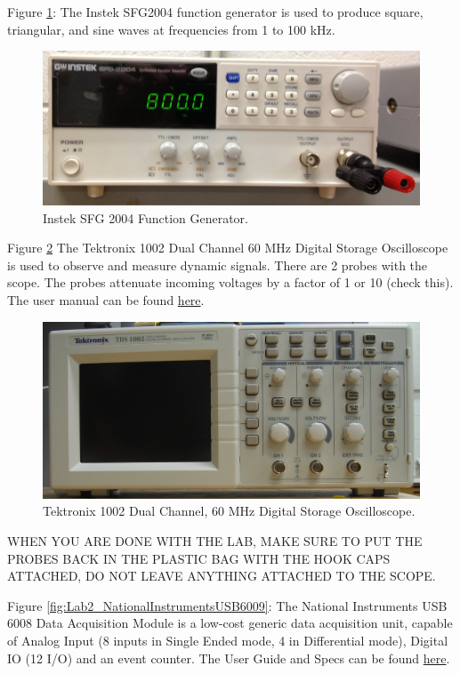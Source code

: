 \documentclass[11pt,letterpaper]{article}
\begin{document}
Figure \ref{fig:Lab2_Instek_SFG2004_FunctionGenerator}: The Instek SFG2004 function generator is used to produce square, triangular, and sine waves at frequencies from 1 to 100 kHz.\\

\begin{figure}
\centering
\includegraphics[width=0.7\linewidth]{Lab2_Instek_SFG2004_FunctionGenerator}
\caption{Instek SFG 2004 Function Generator.}
\label{fig:Lab2_Instek_SFG2004_FunctionGenerator}
\end{figure}


Figure \ref{fig:Lab2_Tektronix1002_Oscilloscope} The Tektronix 1002 Dual Channel 60 MHz Digital Storage Oscilloscope is used to observe and measure dynamic signals.  There are 2 probes with the scope.  The probes attenuate incoming voltages by a factor of 1 or 10 (check this). The user manual can be found \href{http://abe-research.illinois.edu/Faculty/grift/ABE425_2016/Specs/tds1002_user_manual.pdf}{here}.

\begin{figure}
\centering
\includegraphics[width=0.7\linewidth]{Lab2_Tektronix1002_Oscilloscope}
\caption{Tektronix 1002 Dual Channel, 60 MHz Digital Storage Oscilloscope.}
\label{fig:Lab2_Tektronix1002_Oscilloscope}
\end{figure}

\begin{center}
WHEN YOU ARE DONE WITH THE LAB, MAKE SURE TO PUT THE PROBES BACK IN THE PLASTIC BAG WITH THE HOOK CAPS ATTACHED, DO NOT LEAVE ANYTHING ATTACHED TO THE SCOPE.
\end{center}

Figure \ref{fig:Lab2_NationalInstrumentsUSB6009}: The National Instruments USB 6008 Data Acquisition Module is a low-cost generic data acquisition unit, capable of Analog Input (8 inputs in Single Ended mode, 4 in Differential mode), Digital IO (12 I/O) and an event counter. The User Guide and Specs can be found \href{http://abe-research.illinois.edu/Faculty/grift/ABE425_2016/Specs/USB6008.pdf}{here}.\\
\end{document}
